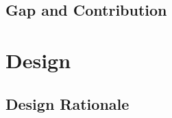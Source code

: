 \documentclass[logo,msc]{infthesis}
\begin{document}
\section{Gap and Contribution}
%


\chapter{Design}

\section{Design Rationale}
%
%
%
\end{document}
